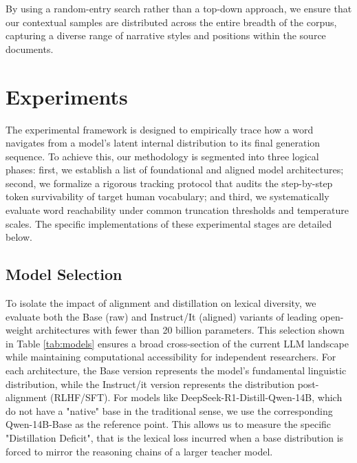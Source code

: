 \documentclass{article}
\begin{document}
By using a random-entry search rather than a top-down approach, we ensure that our contextual samples are distributed across the entire breadth of the corpus, capturing a diverse range of narrative styles and positions within the source documents.

\section{Experiments}
\label{sec::experiments}

The experimental framework is designed to empirically trace how a word navigates from a model's latent internal distribution to its final generation sequence. To achieve this, our methodology is segmented into three logical phases: first, we establish a list of foundational and aligned model architectures; second, we formalize a rigorous tracking protocol that audits the step-by-step token survivability of target human vocabulary; and third, we systematically evaluate word reachability under common truncation thresholds and temperature scales. The specific implementations of these experimental stages are detailed below.


\subsection{Model Selection}

To isolate the impact of alignment and distillation on lexical diversity, we evaluate both the Base (raw) and Instruct/It (aligned) variants of leading open-weight architectures with fewer than 20 billion parameters. This selection shown in Table \ref{tab:models} ensures a broad cross-section of the current LLM landscape while maintaining computational accessibility for independent researchers. For each architecture, the Base version represents the model's fundamental linguistic distribution, while the Instruct/it version represents the distribution post-alignment (RLHF/SFT). For models like DeepSeek-R1-Distill-Qwen-14B, which do not have a "native" base in the traditional sense, we use the corresponding Qwen-14B-Base as the reference point. This allows us to measure the specific "Distillation Deficit", that is the lexical loss incurred when a base distribution is forced to mirror the reasoning chains of a larger teacher model.
\end{document}
